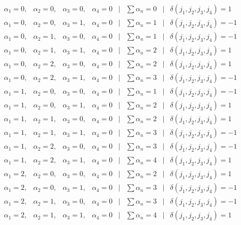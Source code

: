 \documentclass[a4paper,11pt,twoside]{report}
\begin{document}
	\[\begin{matrix}
		\alpha_1 = 0, & \alpha_2 = 0, & \alpha_3 = 0, & \alpha_4 = 0 & | & \sum \alpha_{n} = 0 &| & \delta(j_1,j_2,j_3,j_4) = 1\\
		\alpha_1 = 0, & \alpha_2 = 0, & \alpha_3 = 1, & \alpha_4 = 0& | & \sum \alpha_{n} = 1&| & \delta(j_1,j_2,j_3,j_4) = -1\\
		\alpha_1 = 0, & \alpha_2 = 1, & \alpha_3 = 0, & \alpha_4 = 0& | & \sum \alpha_{n} = 1&| & \delta(j_1,j_2,j_3,j_4) = -1\\
		\alpha_1 = 0, & \alpha_2 = 1, & \alpha_3 = 1, & \alpha_4 = 0& | & \sum \alpha_{n} = 2&| & \delta(j_1,j_2,j_3,j_4) = 1\\
		\alpha_1 = 0, & \alpha_2 = 2, & \alpha_3 = 0, & \alpha_4 = 0& | & \sum \alpha_{n} = 2&| & \delta(j_1,j_2,j_3,j_4) = 1\\
		\alpha_1 = 0, & \alpha_2 = 2, & \alpha_3 = 1, & \alpha_4 = 0& | & \sum \alpha_{n} = 3&| & \delta(j_1,j_2,j_3,j_4) = -1\\
		\alpha_1 = 1, & \alpha_2 = 0, & \alpha_3 = 0, & \alpha_4 = 0& | & \sum \alpha_{n} = 1&| & \delta(j_1,j_2,j_3,j_4) = -1\\
		\alpha_1 = 1, & \alpha_2 = 0, & \alpha_3 = 1, & \alpha_4 = 0& | & \sum \alpha_{n} = 2&| & \delta(j_1,j_2,j_3,j_4) = 1\\
		\alpha_1 = 1, & \alpha_2 = 1, & \alpha_3 = 0, & \alpha_4 = 0& | & \sum \alpha_{n} = 2&| & \delta(j_1,j_2,j_3,j_4) = 1\\
		\alpha_1 = 1, & \alpha_2 = 1, & \alpha_3 = 1, & \alpha_4 = 0& | & \sum \alpha_{n} = 3&| & \delta(j_1,j_2,j_3,j_4) = -1\\
		\alpha_1 = 1, & \alpha_2 = 2, & \alpha_3 = 0, & \alpha_4 = 0& | & \sum \alpha_{n} = 3&| & \delta(j_1,j_2,j_3,j_4) = -1\\
		\alpha_1 = 1, & \alpha_2 = 2, & \alpha_3 = 1, & \alpha_4 = 0& | & \sum \alpha_{n} = 4&| & \delta(j_1,j_2,j_3,j_4) = 1\\
		\alpha_1 = 2, & \alpha_2 = 0, & \alpha_3 = 0, & \alpha_4 = 0& | & \sum \alpha_{n} = 2&| & \delta(j_1,j_2,j_3,j_4) = 1\\
		\alpha_1 = 2, & \alpha_2 = 0, & \alpha_3 = 1, & \alpha_4 = 0& | & \sum \alpha_{n} = 3&| & \delta(j_1,j_2,j_3,j_4) = -1\\
		\alpha_1 = 2, & \alpha_2 = 1, & \alpha_3 = 0, & \alpha_4 = 0& | & \sum \alpha_{n} = 3&| & \delta(j_1,j_2,j_3,j_4) = -1\\
		\alpha_1 = 2, & \alpha_2 = 1, & \alpha_3 = 1, & \alpha_4 = 0& | & \sum \alpha_{n} = 4&| & \delta(j_1,j_2,j_3,j_4) = 1\\

\end{matrix}\]
\end{document}
